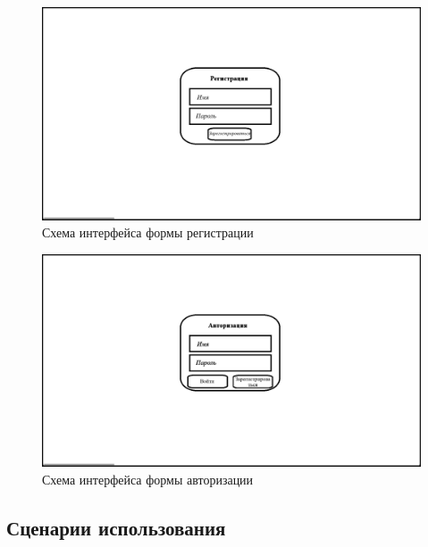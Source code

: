 \begin{figure}[h]
	\centering
	\includegraphics[width=0.8\linewidth]{"images/UI макет регистрации"}
	\caption{Схема интерфейса формы регистрации}
	\label{fig:ui-reg}
\end{figure}

\begin{figure}[h]
	\centering
	\includegraphics[width=0.8\linewidth]{"images/UI макет авторизации"}
	\caption{Схема интерфейса формы авторизации}
	\label{fig:ui-auth}
\end{figure}

\subsection{Сценарии использования}

